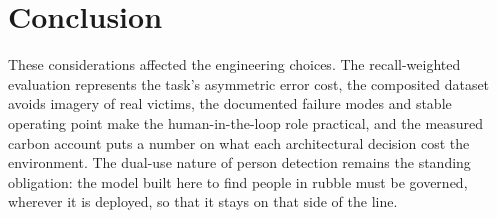 \section{Conclusion}
These considerations affected the engineering choices. The recall-weighted
evaluation represents the task's asymmetric error cost, the
composited dataset avoids imagery of real victims, the documented failure
modes and stable operating point make the human-in-the-loop role practical,
and the measured carbon account puts a number on what each architectural
decision cost the environment. The dual-use nature of person detection
remains the standing obligation: the model built here to find people in
rubble must be governed, wherever it is deployed, so that it stays on that
side of the line.
